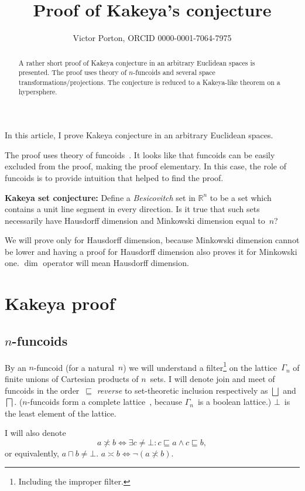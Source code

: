 \documentclass[oneside,draft]{amsart}
\title{Proof of Kakeya's conjecture}
\author{Victor Porton, ORCID 0000-0001-7064-7975}
\newcommand{\intrs}{\not\asymp}
\newcommand{\nintrs}{\asymp}
\begin{document}
\begin{abstract}
A rather short proof of Kakeya conjecture in an arbitrary Euclidean spaces is presented. The proof uses theory of $n$-fun\-co\-ids and several space transformations/projections. The conjecture is reduced to a Ka\-ke\-ya-li\-ke theorem on a hypersphere.
\end{abstract}

\maketitle  

In this article, I prove Kakeya conjecture in an arbitrary Euclidean spaces.

The proof uses theory of funcoids~\cite{volume-1}. It looks like that funcoids can be easily excluded from the proof, making the proof elementary. In this case, the role of funcoids is to provide intuition that helped to find the proof.

\textbf{Kakeya set conjecture:} \cite{kakeya-long,tao-blog-kakeya} Define a \emph{Besicovitch} set in $\mathbb{R}^n$ to be a set which contains a unit line segment in every direction. Is it true that such sets necessarily have Hausdorff dimension and Minkowski dimension equal to~$n$?

We will prove only for Hausdorff dimension, because Minkowski dimension cannot be lower and having a proof for Hausdorff dimension also proves it for Minkowski one. $\dim$ operator will mean Hausdorff dimension.

\section{Kakeya proof}

\subsection{$n$-fun\-co\-ids}

By an $n$-fun\-co\-id (for a natural~$n$) we will understand a filter\footnote{Including the improper filter.} on the lattice~$\Gamma_n$ of finite unions of Cartesian products of $n$~sets. I will denote join and meet of funcoids in the order~$\sqsubseteq$ \emph{reverse} to set-the\-o\-re\-tic inclusion respectively as $\bigsqcup$ and $\bigsqcap$. ($n$-fun\-co\-ids form a complete lattice~\cite{volume-1}, because $\Gamma_n$~is a boolean lattice.) $\bot$~is the least element of the lattice.

I will also denote \[ a\intrs b \Leftrightarrow \exists c\ne\bot: c\sqsubseteq a\land c\sqsubseteq b, \] or equivalently, $a\sqcap b\ne\bot$.
$a\nintrs b\Leftrightarrow\lnot(a\intrs b)$.
\end{document}
